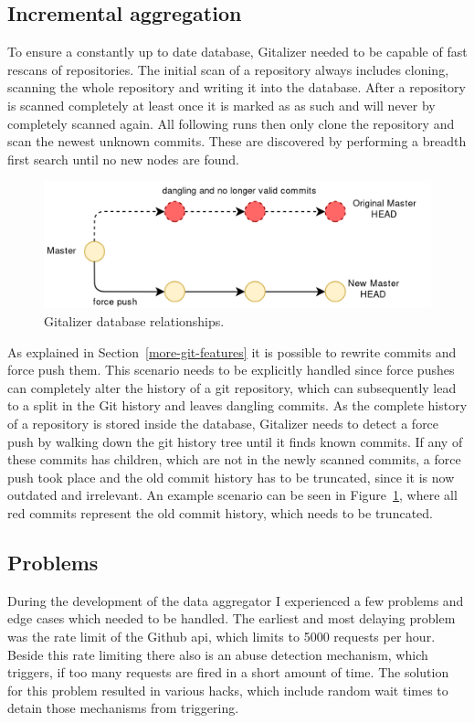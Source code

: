 \subsection{Incremental aggregation}
To ensure a constantly up to date database, Gitalizer needed to be capable of fast rescans of repositories.
The initial scan of a repository always includes cloning, scanning the whole repository and writing it into the database.
After a repository is scanned completely at least once it is marked as as such and will never by completely scanned again.
All following runs then only clone the repository and scan the newest unknown commits.
These are discovered by performing a breadth first search until no new nodes are found.

\begin{figure}[H]
\includegraphics[scale=0.3]{./graphs/git-history-rewrite}
\centering
\caption{Gitalizer database relationships.}\label{fig:gitalizer-relationship}
\end{figure}

As explained in Section~\ref{more-git-features} it is possible to rewrite commits and force push them.
This scenario needs to be explicitly handled since force pushes can completely alter the history of a git repository, which can subsequently lead to a split in the Git history and leaves dangling commits.
As the complete history of a repository is stored inside the database, Gitalizer needs to detect a force push by walking down the git history tree until it finds known commits.
If any of these commits has children, which are not in the newly scanned commits, a force push took place and the old commit history has to be truncated, since it is now outdated and irrelevant.
An example scenario can be seen in Figure~\ref{fig:gitalizer-relationship}, where all red commits represent the old commit history, which needs to be truncated.


\subsection{Problems}
During the development of the data aggregator I experienced a few problems and edge cases which needed to be handled.
The earliest and most delaying problem was the rate limit of the Github \ac{api}, which limits to 5000 requests per hour.
Beside this rate limiting there also is an abuse detection mechanism, which triggers, if too many requests are fired in a short amount of time.
The solution for this problem resulted in various hacks, which include random wait times to detain those mechanisms from triggering.

